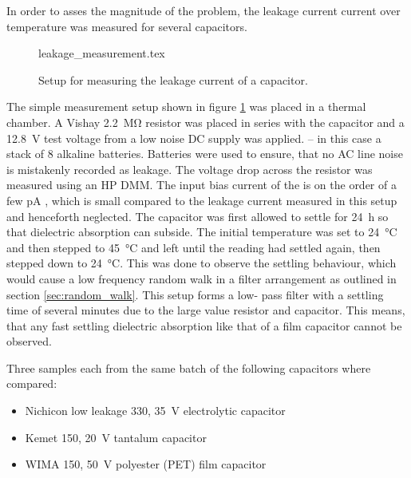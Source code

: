 In order to asses the magnitude of the problem, the leakage current current over temperature was measured for several capacitors.
\begin{figure}[ht]
    \centering
        {leakage_measurement.tex}
    \caption{Setup for measuring the leakage current of a capacitor.}
    \label{fig:capacitor_leakage_measurement}
\end{figure}

The simple measurement setup shown in figure \ref{fig:capacitor_leakage_measurement} was placed in a thermal chamber. A Vishay  \qty{2.2}{\mega\ohm} resistor was placed in series with the capacitor and a \qty{12.8}{\V} test voltage from a low noise DC supply was applied. -- in this case a stack of \num{8} alkaline batteries. Batteries were used to ensure, that no AC line noise is mistakenly recorded as leakage. The voltage drop across the resistor was measured using an HP  DMM. The input bias current of the  is on the order of a few \unit{\pA} \cite{article_3458A_input_impedance, article_3458A_input_impedance_2}, which is small compared to the leakage current measured in this setup and henceforth neglected. The capacitor was first allowed to settle for \qty{24}{\hour} so that dielectric absorption can subside. The initial temperature was set to \qty{24}{\celsius} and then stepped to \qty{45}{\celsius} and left until the reading had settled again, then stepped down to \qty{24}{\celsius}. This was done to observe the settling behaviour, which would cause a low frequency random walk in a filter arrangement as outlined in section \ref{sec:random_walk}. This setup forms a low- pass filter with a settling time of several minutes due to the large value resistor and capacitor. This means, that any fast settling dielectric absorption like that of a film capacitor cannot be observed.

Three samples each from the same batch of the following capacitors where compared:
\begin{itemize}
    \itemsep0em
    \item Nichicon  low leakage \qty{330}{\uF}, \qty{35}{\V} electrolytic capacitor
    \item Kemet  \qty{150}{\uF}, \qty{20}{\V} tantalum capacitor
    \item WIMA  \qty{150}{\uF}, \qty{50}{\V} polyester (PET) film capacitor
\end{itemize}

